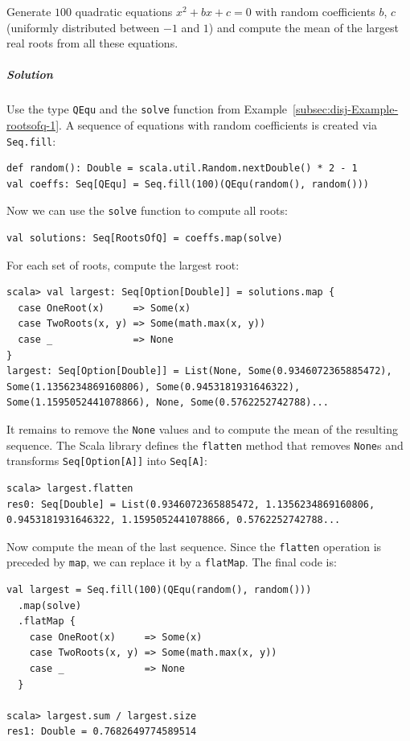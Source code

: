 Generate $100$ quadratic equations $x^{2}+bx+c=0$ with random coefficients
$b$, $c$ (uniformly distributed between $-1$ and $1$) and compute
the mean of the largest real roots from all these equations.

\subparagraph{Solution}

Use the type \lstinline!QEqu! and the \lstinline!solve! function
from Example~\ref{subsec:disj-Example-rootsofq-1}. A sequence of
equations with random coefficients is created via \lstinline!Seq.fill!:
\begin{lstlisting}
def random(): Double = scala.util.Random.nextDouble() * 2 - 1
val coeffs: Seq[QEqu] = Seq.fill(100)(QEqu(random(), random()))
\end{lstlisting}
Now we can use the \lstinline!solve! function to compute all roots:
\begin{lstlisting}
val solutions: Seq[RootsOfQ] = coeffs.map(solve)
\end{lstlisting}
For each set of roots, compute the largest root:
\begin{lstlisting}
scala> val largest: Seq[Option[Double]] = solutions.map {
  case OneRoot(x)     => Some(x)
  case TwoRoots(x, y) => Some(math.max(x, y))
  case _              => None
}
largest: Seq[Option[Double]] = List(None, Some(0.9346072365885472), Some(1.1356234869160806), Some(0.9453181931646322), Some(1.1595052441078866), None, Some(0.5762252742788)...
\end{lstlisting}
It remains to remove the \lstinline!None! values and to compute the
mean of the resulting sequence. The Scala library defines the \lstinline!flatten!
method that removes \lstinline!None!s and transforms \lstinline!Seq[Option[A]]!
into \lstinline!Seq[A]!:
\begin{lstlisting}
scala> largest.flatten
res0: Seq[Double] = List(0.9346072365885472, 1.1356234869160806, 0.9453181931646322, 1.1595052441078866, 0.5762252742788...
\end{lstlisting}
Now compute the mean of the last sequence. Since the \lstinline!flatten!
operation is preceded by \lstinline!map!, we can replace it by a
\lstinline!flatMap!. The final code is:
\begin{lstlisting}
val largest = Seq.fill(100)(QEqu(random(), random()))
  .map(solve)
  .flatMap {
    case OneRoot(x)     => Some(x)
    case TwoRoots(x, y) => Some(math.max(x, y))
    case _              => None
  }

scala> largest.sum / largest.size
res1: Double = 0.7682649774589514
\end{lstlisting}


